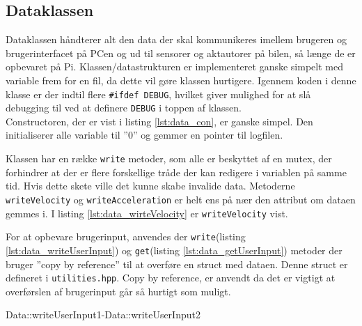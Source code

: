 \subsection{Dataklassen}

Dataklassen håndterer alt den data der skal kommunikeres imellem brugeren og brugerinterfacet på PCen og ud til sensorer og aktautorer på bilen, så længe de er opbevaret på Pi. Klassen/datastrukturen er implementeret ganske simpelt med variable frem for en fil, da dette vil gøre klassen hurtigere. Igennem koden i denne klasse er der indtil flere \texttt{\#ifdef DEBUG}, hvilket giver mulighed for at slå debugging til ved at definere \texttt{DEBUG} i toppen af klassen. \\
Constructoren, der er vist i listing \ref{lst:data_con}, er ganske simpel. Den initialiserer alle variable til ''0'' og gemmer en pointer til logfilen.



Klassen har en række \texttt{write} metoder, som alle er beskyttet af en mutex, der forhindrer at der er flere forskellige tråde der kan redigere i variablen på samme tid. Hvis dette skete ville det kunne skabe invalide data. Metoderne \texttt{writeVelocity} og \texttt{writeAcceleration} er helt ens på nær den attribut om dataen gemmes i. I listing \ref{lst:data_wirteVelocity} er \texttt{writeVelocity} vist.



For at opbevare brugerinput, anvendes der \texttt{write}(listing \ref{lst:data_writeUserInput}) og \texttt{get}(listing \ref{lst:data_getUserInput}) metoder der bruger ''copy by reference'' til at overføre en struct med dataen. Denne struct er defineret i \texttt{utilities.hpp}. Copy by reference, er anvendt da det er vigtigt at overførslen af brugerinput går så hurtigt som muligt.

Data::writeUserInput1-Data::writeUserInput2




